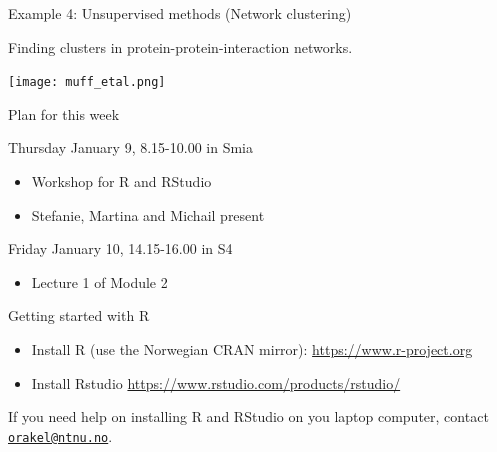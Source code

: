 \documentclass[10pt,ignorenonframetext,]{beamer}
\providecommand{\tightlist}{%
  \setlength{\itemsep}{0pt}\setlength{\parskip}{0pt}}
\begin{document}
\begin{frame}{Example 4: Unsupervised methods (Network clustering)}

\vspace{2mm}

Finding clusters in protein-protein-interaction networks. \vspace{2mm}

\texttt{[image: muff\_etal.png]}

\end{frame}

\begin{frame}{Plan for this week}

\begin{block}{Thursday January 9, 8.15-10.00 in Smia}

\begin{itemize}
\item
  Workshop for R and RStudio
\item
  Stefanie, Martina and Michail present
\end{itemize}

\vspace{4mm}

\end{block}

\begin{block}{Friday January 10, 14.15-16.00 in S4}

\begin{itemize}
\tightlist
\item
  Lecture 1 of Module 2
\end{itemize}

\end{block}

\end{frame}

\begin{frame}{Getting started with R}

\vspace{2mm}

\begin{itemize}
\tightlist
\item
  Install R (use the Norwegian CRAN mirror):
  \url{https://www.r-project.org}
\end{itemize}

\vspace{2mm}

\begin{itemize}
\tightlist
\item
  Install Rstudio \url{https://www.rstudio.com/products/rstudio/}
\end{itemize}

\vspace{4mm}

If you need help on installing R and RStudio on you laptop computer,
contact \href{mailto:orakel@ntnu.no}{\nolinkurl{orakel@ntnu.no}}.

\end{frame}
\end{document}
